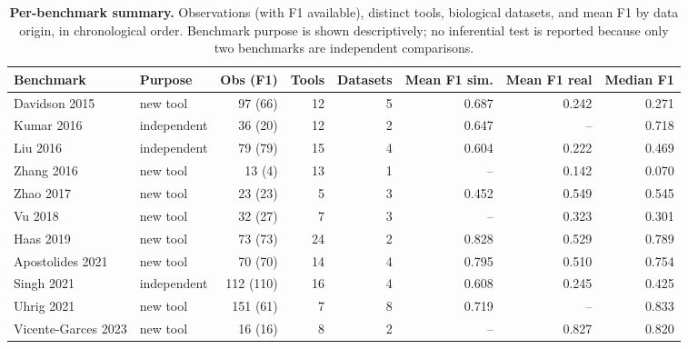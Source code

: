 \begin{table}[!htbp]
\centering
\footnotesize
\caption{\textbf{Per-benchmark summary.} Observations (with F1 available), distinct tools, biological datasets, and mean F1 by data origin, in chronological order. Benchmark purpose is shown descriptively; no inferential test is reported because only two benchmarks are independent comparisons.}
\label{tab:supp_benchmark_summary}
\begin{tabular}{llrrrrrr}
\toprule
Benchmark & Purpose & Obs (F1) & Tools & Datasets & Mean F1 sim. & Mean F1 real & Median F1 \\
\midrule
Davidson 2015 & new tool & 97 (66) & 12 & 5 & 0.687 & 0.242 & 0.271 \\
Kumar 2016 & independent & 36 (20) & 12 & 2 & 0.647 & -- & 0.718 \\
Liu 2016 & independent & 79 (79) & 15 & 4 & 0.604 & 0.222 & 0.469 \\
Zhang 2016 & new tool & 13 (4) & 13 & 1 & -- & 0.142 & 0.070 \\
Zhao 2017 & new tool & 23 (23) & 5 & 3 & 0.452 & 0.549 & 0.545 \\
Vu 2018 & new tool & 32 (27) & 7 & 3 & -- & 0.323 & 0.301 \\
Haas 2019 & new tool & 73 (73) & 24 & 2 & 0.828 & 0.529 & 0.789 \\
Apostolides 2021 & new tool & 70 (70) & 14 & 4 & 0.795 & 0.510 & 0.754 \\
Singh 2021 & independent & 112 (110) & 16 & 4 & 0.608 & 0.245 & 0.425 \\
Uhrig 2021 & new tool & 151 (61) & 7 & 8 & 0.719 & -- & 0.833 \\
Vicente-Garces 2023 & new tool & 16 (16) & 8 & 2 & -- & 0.827 & 0.820 \\
\bottomrule
\end{tabular}
\end{table}
